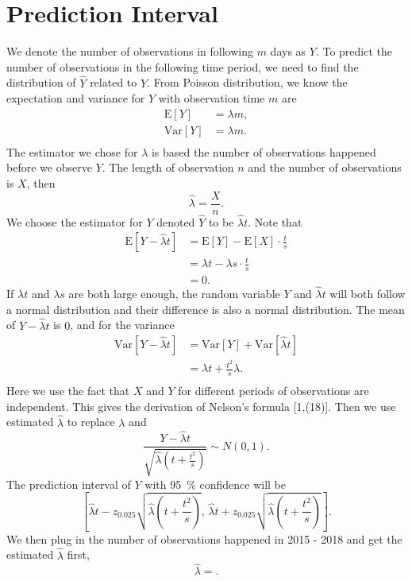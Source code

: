 \documentclass[11pt,a4paper,english]{article}
\begin{document}
\section{Prediction Interval}
We denote the number of observations in following  $m$ days as $Y$.
To predict the number of observations in the following time period, we need to find the distribution of $\hat{Y}$ related to $Y$. 
From Poisson distribution, we know the expectation and variance for $Y$ with observation time $m$ are
\begin{align*}
	\text{E}[Y] &= \lambda m,\\
	\text{Var}[Y] &= \lambda m.\\
\end{align*}
The estimator we chose for $\lambda$ is based the number of observations happened before we observe $Y$.
The length of observation $n$ and the number of observations is $X$, then
\begin{equation*}
	\hat{\lambda} = \frac{X}{n}.
\end{equation*}
We choose the estimator for $Y$ denoted $\hat{Y}$ to be $\hat{\lambda}t$.
Note that
\begin{align*}
	\text{E}[Y-\hat{\lambda}t] &= \text{E}[Y]-\text{E}[X]\cdot\frac{t}{s}\\
	&= \lambda t-\lambda s \cdot \frac{t}{s}\\
	&= 0.
\end{align*}
If $\lambda t$ and $\lambda s$ are both large enough, the random variable $Y$ and $\hat{\lambda}t$ will both follow a normal distribution and their difference is also a normal distribution.
The mean of $Y-\hat{\lambda}t$ is $0$, and for the variance
\begin{align*}
	\text{Var}[Y-\hat{\lambda}t] &= \text{Var}[Y]+\text{Var}[\hat{\lambda}t]\\
	&= \lambda t+\frac{t^{2}}{s}\lambda.\\
\end{align*}
Here we use the fact that $X$ and $Y$ for different periods of observations are independent.
This gives the derivation of Nelson's formula [1,(18)].
Then we use estimated $\hat{\lambda}$ to replace $\lambda$ and 
\begin{equation*}
	\frac{Y-\hat{\lambda}t}{\sqrt{\hat{\lambda}\left(t+\frac{t^{2}}{s}\right)}} \sim N(0,1).
\end{equation*}
The prediction interval of $Y$ with \SI{95}{\percent} confidence will be 
\begin{equation*}
	\left[
	\hat{\lambda}t-z_{0.025}\sqrt{\hat{\lambda}\left(t+\frac{t^{2}}{s}\right)},
	\,
	\hat{\lambda}t+z_{0.025}\sqrt{\hat{\lambda}\left(t+\frac{t^{2}}{s}\right)}
	\right].
\end{equation*}
We then plug in the number of observations happened in 2015 - 2018 and get the estimated $\hat{\lambda}$ first,
\[\hat{\lambda} = .\]
\end{document}

